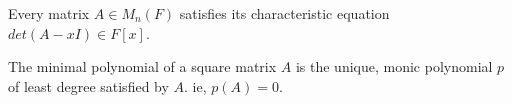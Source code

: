 \begin{theorem}
	Every matrix $A \in M_n(F)$ satisfies its characteristic equation $det(A-xI) \in F[x]$.
\end{theorem}

\begin{definition}
	The minimal polynomial of a square matrix $A$ is the unique, monic polynomial $p$ of least degree satisfied by $A$. ie, $p(A) = 0$.
\end{definition}


